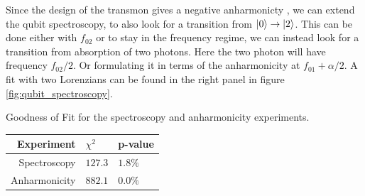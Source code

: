 Since the design of the transmon gives a negative anharmonicty , we can extend the qubit spectroscopy, to also look for a transition from $\ket{0}\to \ket{2}$. This can be done either with $f_{02}$ or to stay in the frequency regime, we can instead look for a transition from absorption of two photons. Here the two photon will have frequency $f_{02} / 2$. Or formulating it in terms of the anharmonicity at $f_{01} + \alpha / 2$. A fit with two Lorenzians can be found in the right panel in figure \ref{fig:qubit_spectroscopy}. 
\begin{margintable}
    \caption{Goodness of Fit for the spectroscopy and anharmonicity experiments.}
    \centering
    \begin{tabular}{r|ll}
        Experiment      & $\chi^2$      &p-value   \\ \hline
        Spectroscopy    & $127.3$       & $1.8 \%$   \\
        Anharmonicity   & $882.1$       & $0.0 \%$   \\
    \end{tabular}
    \label{tab:spectroscopy fit}
\end{margintable}
